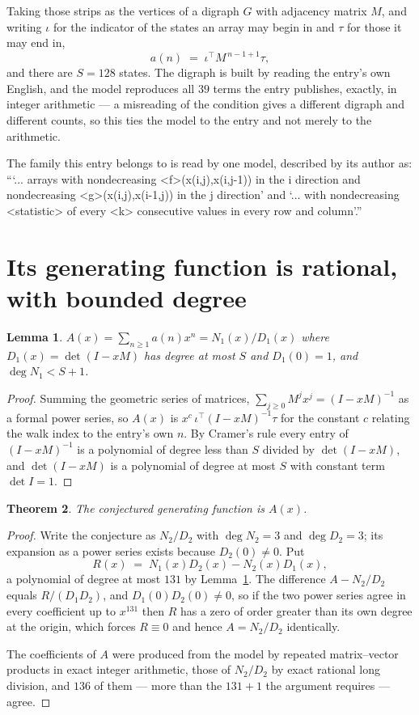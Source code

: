 \documentclass[11pt,a4paper]{article}
\theoremstyle{plain}
\newtheorem{theorem}{Theorem}
\newtheorem{lemma}[theorem]{Lemma}
\theoremstyle{definition}
\begin{document}
Taking those strips as the vertices of a digraph $G$ with adjacency matrix $M$, and writing
$\iota$ for the indicator of the states an array may begin in and $\tau$ for those it may end
in,
\[
a(n)\;=\;\iota^{\!\top}M^{\,n-1+1}\tau ,
\]
and there are $S=128$ states. The digraph is built by reading the entry's own English, and the
model reproduces all $39$ terms the entry publishes, exactly, in integer arithmetic --- a
misreading of the condition gives a different digraph and different counts, so this ties the
model to the entry and not merely to the arithmetic.

The family this entry belongs to is read by one model, described by its author as: ```... arrays with nondecreasing <f>(x(i,j),x(i,j-1)) in the i direction and nondecreasing <g>(x(i,j),x(i-1,j)) in the j direction' and `... with nondecreasing <statistic> of every <k> consecutive values in every row and column'.''


\section{Its generating function is rational, with bounded degree}

\begin{lemma}\label{lem:rat}
$A(x)=\sum_{n\ge1}a(n)x^n=N_1(x)/D_1(x)$ where $D_1(x)=\det(I-xM)$ has degree at most
$S$ and $D_1(0)=1$, and $\deg N_1<S+1$.
\end{lemma}

\begin{proof}
Summing the geometric series of matrices, $\sum_{j\ge0}M^jx^j=(I-xM)^{-1}$ as a formal
power series, so $A(x)$ is $x^{c}\,\iota^{\!\top}(I-xM)^{-1}\tau$ for the constant $c$
relating the walk index to the entry's own $n$. By Cramer's rule every entry of
$(I-xM)^{-1}$ is a polynomial of degree less than $S$ divided by $\det(I-xM)$, and
$\det(I-xM)$ is a polynomial of degree at most $S$ with constant term $\det I=1$.
\end{proof}

\begin{theorem}
The conjectured generating function is $A(x)$.
\end{theorem}

\begin{proof}
Write the conjecture as $N_2/D_2$ with $\deg N_2=3$ and $\deg D_2=3$; its expansion as a
power series exists because $D_2(0)\neq0$. Put
\[
R(x)\;=\;N_1(x)D_2(x)-N_2(x)D_1(x),
\]
a polynomial of degree at most $131$ by Lemma~\ref{lem:rat}. The difference
$A-N_2/D_2$ equals $R/(D_1D_2)$, and $D_1(0)D_2(0)\neq0$, so if the two power series agree in
every coefficient up to $x^{131}$ then $R$ has a zero of order greater than its own
degree at the origin, which forces $R\equiv0$ and hence $A=N_2/D_2$ identically.

The coefficients of $A$ were produced from the model by repeated matrix--vector products in
exact integer arithmetic, those of $N_2/D_2$ by exact rational long division, and $136$
of them --- more than the $131+1$ the argument requires --- agree.
\end{proof}
\end{document}
